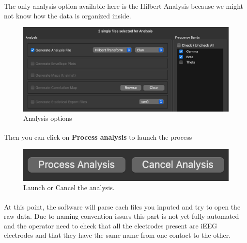 \documentclass[a4paper]{article}
\begin{document}
The only analysis option available here is the Hilbert Analysis because we might not know how the data is organized inside.

\begin{figure}[H]
\begin{center}
\includegraphics[scale=0.6]{MiscAnalysisOptions.png}
\end{center}
\caption{\label{MiscAnalysisOptionsUI}Analysis options}
\end{figure}

\paragraph{} Then you can click on \textbf{Process analysis} to launch the process
\begin{figure}[H]
\begin{center}
\includegraphics[scale=0.6]{ProcessCancel.png}
\end{center}
\caption{\label{RunAnalysisMiscUI}Launch or Cancel the analysis.}
\end{figure}

\paragraph{} At this point, the software will parse each files you inputed and try to open the raw data. Due to naming convention issues this part is not yet fully automated and the operator need to check that all the electrodes present are iEEG electrodes and that they have the same name from one contact to the other. 
\end{document}
